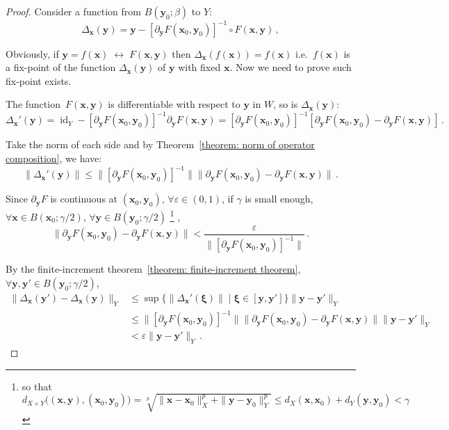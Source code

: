 \documentclass[openany]{book}
\theoremstyle{plain}
\theoremstyle{definition}
\newcommand*{\bv}{\boldsymbol} %
\newcommand*{\IFF}{\;\leftrightarrow\;} %
\DeclareMathOperator{\id}{id}
\begin{document}
\begin{proof}
	Consider a function from $B(\bv y_0; \beta)$ to $Y$: 
	\begin{equation*}
		\Delta_{\bv x} (\bv y) 
			= \bv y - [\partial_{\bv y} F(\bv x_0, \bv y_0)]^{-1} \circ F(\bv x, \bv y)\,,
	\end{equation*}
	
	Obviously, if $\bv y = f(\bv x) \IFF F(\bv x, \bv y)$ then $\Delta_{\bv x} (f(\bv x)) = f(\bv x)$ i.e.\ $f(\bv x)$ is a fix-point of the function $\Delta_{\bv x} (\bv y)$ of $\bv y$ with fixed $\bv x$. 
	Now we need to prove such fix-point exists.

	The function~$F(\bv x, \bv y)$ is differentiable with respect to $\bv y$ in $W$, so is $\Delta_{\bv x}(\bv y)$:
	\begin{equation*}
		\Delta_{\bv x}'(\bv y) 
		= \id_Y - [\partial_{\bv y} F(\bv x_0, \bv y_0)]^{-1} \partial_{\bv y} F(\bv x, \bv y) 
		= [\partial_{\bv y} F(\bv x_0, \bv y_0)]^{-1} [\partial_{\bv y} F(\bv x_0, \bv y_0) - \partial_{\bv y} F(\bv x, \bv y)]\,.
	\end{equation*}

	Take the norm of each side and by Theorem~\ref{theorem: norm of operator composition}, we have:
	\begin{equation*}
		\|\Delta_{\bv x}'(\bv y)\| 
			\leq \|[\partial_{\bv y} F(\bv x_0, \bv y_0)]^{-1}\|
			\|\partial_{\bv y} F(\bv x_0, \bv y_0) - \partial_{\bv y} F(\bv x, \bv y)\|\,.
	\end{equation*}

	Since $\partial_{\bv y} F$ is continuous at $(\bv x_0, \bv y_0)$, $\forall \varepsilon \in (0, 1)$, if $\gamma$ is small enough, $\forall \bv x \in B(\bv x_0; \gamma/2)$, $\forall \bv y \in B(\bv y_0; \gamma/2)$%
	\footnote{so that $d_{X \times Y} \big((\bv x, \bv y), (\bv x_0, \bv y_0)\big) = \sqrt[p]{\|\bv x - \bv x_0\|_X^p + \|\bv y - \bv y_0\|_Y^p} \leq d_X(\bv x, \bv x_0) + d_Y(\bv y, \bv y_0) < \gamma$} , 
	\begin{equation*}
		\|\partial_{\bv y} F(\bv x_0, \bv y_0) - \partial_{\bv y} F(\bv x, \bv y)\| 
			< \frac{\varepsilon}{\|[\partial_{\bv y} F(\bv x_0, \bv y_0)]^{-1}\|}\,.
	\end{equation*}
	
	By the finite-increment theorem~\ref{theorem: finite-increment theorem}, $\forall \bv y, \bv y' \in B(\bv y_0; \gamma/2)$, 
	\begin{align*}
		\|\Delta_{\bv x}(\bv y') - \Delta_{\bv x}(\bv y)\|_Y 
			&\leq \sup\{\|\Delta_{\bv x}'(\bv \xi)\| \mid \bv \xi \in [\bv y, \bv y']\}
				\|\bv y - \bv y'\|_Y
		\\
			&\leq \|[\partial_{\bv y} F(\bv x_0, \bv y_0)]^{-1}\|
			\|\partial_{\bv y} F(\bv x_0, \bv y_0) - \partial_{\bv y} F(\bv x, \bv y)\|
			\|\bv y - \bv y'\|_Y
		\\
			&< \varepsilon \|\bv y - \bv y'\|_Y \,.
	\end{align*}
	

\end{proof}
\end{document}
